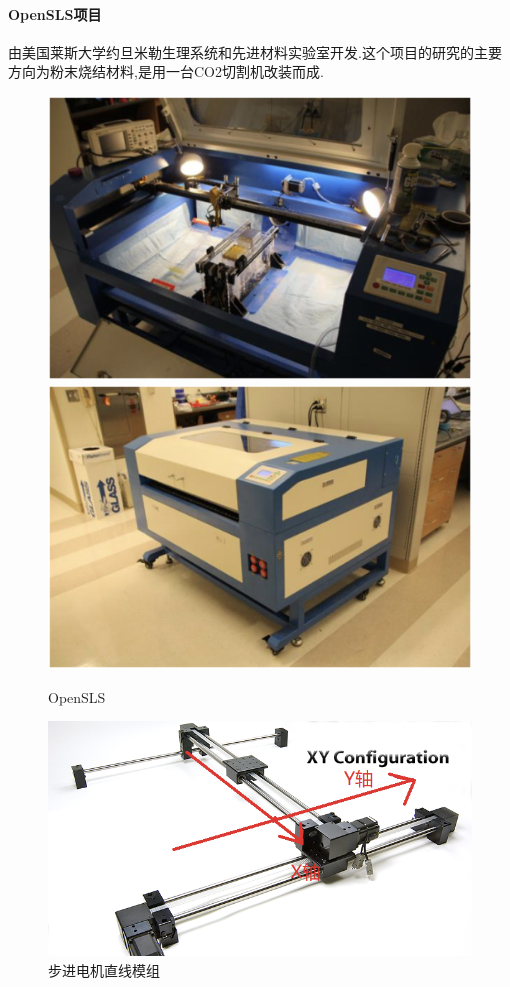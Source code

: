 \documentclass[a4paper,12pt,onecolumn,twoside]{article}
\begin{document}
\paragraph{OpenSLS项目}
由美国莱斯大学约旦米勒生理系统和先进材料实验室开发.这个项目的研究的主要方向为粉末烧结材料,是用一台CO2切割机改装而成.
\begin{figure}[htbp]
\centering     
\includegraphics[width=0.8\linewidth]{OpenSLS0.png}
\centering
\includegraphics[width=0.8\linewidth]{OpenSLS1.png}
\caption{OpenSLS}
\end{figure}
\newpage

\begin{figure}[htbp]
\centering
\includegraphics[width=0.9\linewidth]{OpenSLS2.png}
\caption{步进电机直线模组}
\end{figure}
\end{document}
